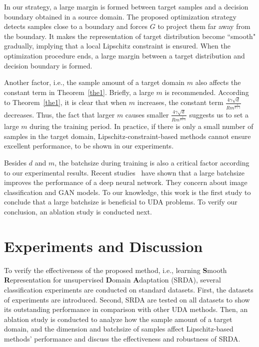 \documentclass[journal,twocolumn]{IEEEtran}
\theoremstyle{definition}
\begin{document}
In our strategy, a large margin is formed between target samples and a decision boundary obtained in a source domain. The proposed optimization strategy detects samples close to a boundary and forces $G$ to project them far away from the boundary. It makes the representation of target distribution become ``smooth" gradually, implying that a local Lipschitz constraint is ensured. When the optimization procedure ends, a large margin between a target distribution and decision boundary is formed.

Another factor, i.e., the sample amount of a target domain $m$  also affects the constant term in Theorem~\ref{the1}. Briefly, a large $m$ is recommended. According to Theorem~\ref{the1}, it is clear that when $m$ increases, the constant term $\frac{4\gamma\sqrt{d}}{Rm^{\frac{1}{d+1}}}$ decreases. Thus, the fact that larger $m$ causes smaller $\frac{4\gamma\sqrt{d}}{Rm^{\frac{1}{d+1}}}$ suggests us to set a large $m$ during the training period. In practice, if there is only a small number of samples in the target domain, Lipschitz-constraint-based methods cannot ensure excellent performance, to be shown in our experiments.

Besides $d$ and $m$, the batchsize during training is also a critical factor according to our experimental results. Recent studies~\cite{brock2018large, He_2019_CVPR} have shown that a large batchsize improves the performance of a deep neural network. They concern about image classification and GAN models. To our knowledge, this work is the first study to conclude that a large batchsize is beneficial to UDA problems. To verify our conclusion, an ablation study is conducted next.

\section{Experiments and Discussion}
\label{experiments}

To verify the effectiveness of the proposed method, i.e., learning {\bf S}mooth {\bf R}epresentation for unsupervised {\bf D}omain {\bf A}daptation (SRDA), several classification experiments are conducted on standard datasets. First, the datasets of experiments are introduced. Second,  SRDA are tested on all datasets to show its outstanding performance in comparison with other UDA methods. Then, an ablation study is conducted to analyze how the sample amount of a target domain, and the dimension and batchsize of samples affect Lipschitz-based methods' performance and discuss the effectiveness and robustness of SRDA.
\end{document}

